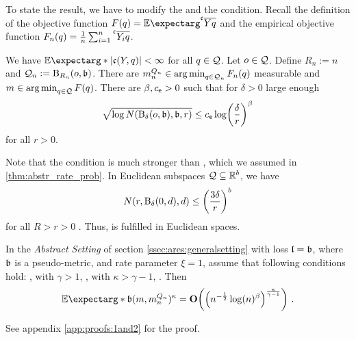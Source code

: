 To state the result, we have to modify the  and the  condition.
Recall the definition of the objective function $F(q) = \Ex{\olc Yq}$ and the empirical objective function $F_n(q) = \frac1n \sum_{i=1}^n \olc{Y_i}q$.
\begin{assumptions}
\theoremContentInNewLine
	\begin{enumerate}[label=\environmentEnumerateLabel]
		We have $\Ex*{\abs{\mf c(Y, q)}} < \infty$ for all $q\in\mathcal{Q}$.
		Let $o\in\mathcal{Q}$. Define $R_n := n$ and $\mathcal{Q}_n := \operatorname{\mathrm{B}}_{R_n}(o,\mathfrak{b})$.
		There are $m^{Q_n}_n \in \operatorname*{arg\,min}_{q\in \mathcal{Q}_n} F_n(q)$ measurable and $m\in\operatorname*{arg\,min}_{q\in\mathcal{Q}} F(q)$.
		There are $\beta, c_{\mathsf{e}} > 0$ such that for $\delta > 0$ large enough
		\begin{equation*}
			\sqrt{\log N(\operatorname{\mathrm{B}}_\delta(o, \mathfrak{b}), \mathfrak{b}, r)} \leq c_{\mathsf{e}} \log\!\left( \frac{\delta}{r} \right)^\beta
		\end{equation*}
		for all $r > 0$.
		\index[inot]{$\beta$}
	\end{enumerate}
\end{assumptions}
%
Note that the  condition is much stronger than , which we assumed in \autoref{thm:abstr_rate_prob}. In Euclidean subspaces $\mathcal{Q} \subseteq \mathbb{R}^b$, we have \begin{equation*}
N(r,\operatorname{\mathrm{B}}_{\delta}(0,d),d) \leq \left( \frac{3 \delta}{r} \right)^b
\end{equation*} for all $R>r>0$ \cite[section 4]{pollard90}. Thus,  is fulfilled in Euclidean spaces.
%
\begin{theorem}\label{thm:abstr_weak_strong}
	In the \textit{Abstract Setting} of section \ref{ssec:ares:generalsetting} with loss $\mathfrak{l} = \mathfrak{b}$, where $\mathfrak{b}$ is a pseudo-metric, and rate parameter $\xi=1$, assume that following conditions hold:
	,  with $\gamma>1$, ,  with $\kappa > \gamma-1$, .
	Then
	\begin{equation*}
		\Ex*{\mf b(m, m^{Q_n}_n)^\kappa} = \bigO\brOf{\br{n^{-\frac12} \log(n)^\beta}^{\frac{\kappa}{\gamma-1}}}
		\eqfs
	\end{equation*}
\end{theorem}
%
See appendix \autoref{app:proofs:1and2} for the proof.
%